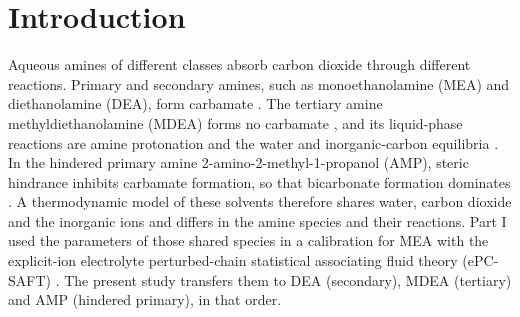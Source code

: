 \section{Introduction}\label{sec:p2-introduction}
Aqueous amines of different classes absorb carbon dioxide through different reactions.
Primary and secondary amines, such as monoethanolamine (MEA) and diethanolamine (DEA), form carbamate \cite[Introduction, p.~7]{xuRepresentationEquilibriumSolubility1992}.
The tertiary amine methyldiethanolamine (MDEA) forms no carbamate \cite[Sect.~3]{Nasrifar2010}, and its liquid-phase reactions are amine protonation and the water and inorganic-carbon equilibria \cite[Sect.~3]{Uyan2015}.
In the hindered primary amine 2-amino-2-methyl-1-propanol (AMP), steric hindrance inhibits carbamate formation, so that bicarbonate formation dominates \cite[Introduction, p.~7; Results and analysis, p.~11]{xuRepresentationEquilibriumSolubility1992}.
A thermodynamic model of these solvents therefore shares water, carbon dioxide and the inorganic ions and differs in the amine species and their reactions.
Part I used the parameters of those shared species in a calibration for MEA with the explicit-ion electrolyte perturbed-chain statistical associating fluid theory (ePC-SAFT) \cite{PolleyPartI}.
The present study transfers them to DEA (secondary), MDEA (tertiary) and AMP (hindered primary), in that order.


